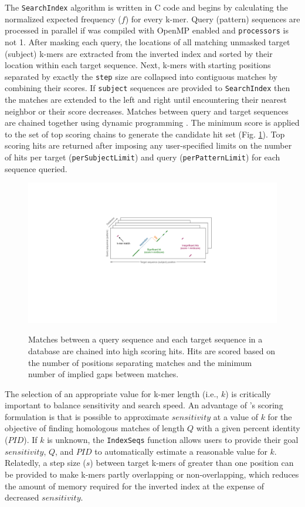 The \texttt{SearchIndex} algorithm is written in C code and begins by calculating the normalized expected frequency (\(f\)) for every k-mer. Query (pattern) sequences are processed in parallel if  was compiled with OpenMP enabled and \texttt{processors} is not 1. After masking each query, the locations of all matching unmasked target (subject) k-mers are extracted from the inverted index and sorted by their location within each target sequence. Next, k-mers with starting positions separated by exactly the \texttt{step} size are collapsed into contiguous matches by combining their scores. If \texttt{subject} sequences are provided to \texttt{SearchIndex} then the matches are extended to the left and right until encountering their nearest neighbor or their score decreases. Matches between query and target sequences are chained together using dynamic programming \citep{RN4260}. The minimum score is applied to the set of top scoring chains to generate the candidate hit set (Fig. \ref{fig:fig2}). Top scoring hits are returned after imposing any user-specified limits on the number of hits per target (\texttt{perSubjectLimit}) and query (\texttt{perPatternLimit}) for each sequence queried.

\begin{figure}
\includegraphics[width=1\linewidth,alt={}]{figures/Fig2} \caption{Matches between a query sequence and each target sequence in a database are chained into high scoring hits. Hits are scored based on the number of positions separating matches and the minimum number of implied gaps between matches.}\label{fig:fig2}
\end{figure}

The selection of an appropriate value for k-mer length (i.e., \(k\)) is critically important to balance sensitivity and search speed. An advantage of 's scoring formulation is that is possible to approximate \(sensitivity\) at a value of \(k\) for the objective of finding homologous matches of length \(Q\) with a given percent identity (\(PID\)). If \(k\) is unknown, the \texttt{IndexSeqs} function allows users to provide their goal \(sensitivity\), \(Q\), and \(PID\) to automatically estimate a reasonable value for \(k\). Relatedly, a step size (\(s\)) between target k-mers of greater than one position can be provided to make k-mers partly overlapping or non-overlapping, which reduces the amount of memory required for the inverted index at the expense of decreased \(sensitivity\).

